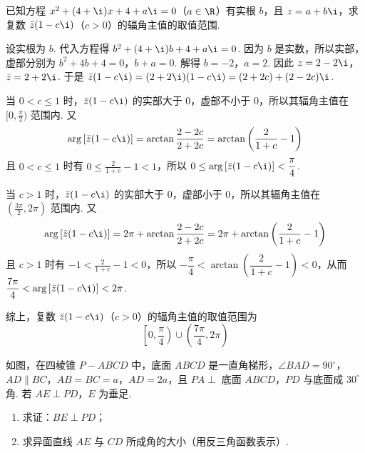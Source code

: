 \documentclass[UTF8,a4paper,oneside,11pt]{ctexbook}
\begin{document}
\begin{problem}
已知方程 \(x^2 + (4 + \i)x + 4 + a\i = 0\)（\(a \in \R\)）有实根 \(b\)，且 \(z = a + b\i\)，求复数 \(\bar z(1 - c\i)\)（\(c > 0\)）的辐角主值的取值范围.
\end{problem}

\begin{solution}
设实根为 \(b\). 代入方程得 \(b^2+(4+\i)b+4+a\i=0\).
因为 \(b\) 是实数，所以实部，虚部分别为 \(b^2+4b+4=0\)，\(b+a=0\).
解得 \(b=-2\)，\(a=2\). 因此 \(z=2-2\i\)，\(\bar z=2+2\i\).
于是 \(\bar z(1-c\i)=(2+2\i)(1-c\i)=(2+2c)+(2-2c)\i\).

当 \(0<c\le1\) 时，\(\bar z(1-c\i)\) 的实部大于 \(0\)，虚部不小于 \(0\)，所以其辐角主值在 \([0,\frac{\pi}{2})\) 范围内.
又
\[
\arg\left[\bar z(1-c\i)\right]=\arctan\frac{2-2c}{2+2c}
=\arctan\left(\frac{2}{1+c}-1\right)
\]
且 \(0<c\le1\) 时有 \(0\le\frac{2}{1+c}-1<1\)，所以 \(0\le \arg\left[\bar z(1-c\i)\right]<\dfrac{\pi}{4}\).

当 \(c>1\) 时，\(\bar z(1-c\i)\) 的实部大于 \(0\)，虚部小于 \(0\)，所以其辐角主值在 \(\left(\frac{3\pi}{2},2\pi\right)\) 范围内.
又
\[
\arg\left[\bar z(1-c\i)\right]=2\pi+\arctan\frac{2-2c}{2+2c}
=2\pi+\arctan\left(\frac{2}{1+c}-1\right)
\]
且 \(c>1\) 时有 \(-1<\frac{2}{1+c}-1<0\)，所以 \(-\dfrac{\pi}{4}<\arctan\left(\dfrac{2}{1+c}-1\right)<0\)，从而 \(\dfrac{7\pi}{4}<\arg\left[\bar z(1-c\i)\right]<2\pi\).

综上，复数 \(\bar z(1-c\i)\)（\(c>0\)）的辐角主值的取值范围为
\[
\left[0,\frac{\pi}{4}\right)\cup\left(\frac{7\pi}{4},2\pi\right)
\]
\end{solution}

\begin{problem}
如图，在四棱锥 \(P-ABCD\) 中，底面 \(ABCD\) 是一直角梯形，\(\angle BAD = 90^\circ\)，\(AD \parallel BC\)，\(AB = BC = a\)，\(AD = 2a\)，且 \(PA \perp\) 底面 \(ABCD\)，\(PD\) 与底面成 \(30^\circ\) 角. 若 \(AE \perp PD\)，\(E\) 为垂足.

\begin{enumerate}
\item 求证：\(BE \perp PD\)；
\item 求异面直线 \(AE\) 与 \(CD\) 所成角的大小（用反三角函数表示）.
\end{enumerate}

\end{problem}
\end{document}
